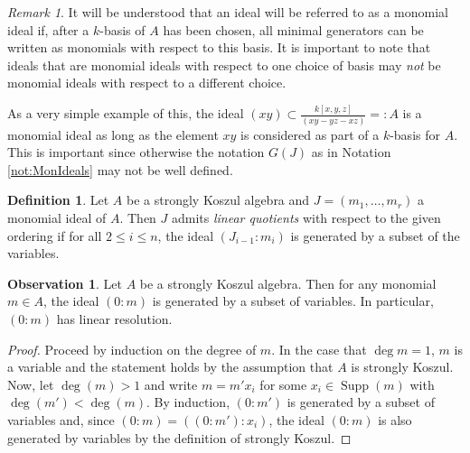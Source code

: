 \documentclass[10pt]{amsart}
\theoremstyle{definition}
\newtheorem{definition}[theorem]{Definition}
\newtheorem{obs}[theorem]{Observation}
\theoremstyle{remark}
\newtheorem{remark}[theorem]{Remark}
\newtheorem{the context}[theorem]{The Context}
\numberwithin{equation}{theorem}
\numberwithin{equation}{section}
\newcommand{\im}{\operatorname{Im}}
\newcommand{\Ker}{\operatorname{Ker}}
\newcommand{\supp}{\operatorname{Supp}}
\renewcommand{\leq}{\leqslant}
\renewcommand{\ker}{\Ker}
\def\im{\operatorname{im}}
\begin{document}
\begin{remark}\label{rk:MonIdeals}
It will be understood that an ideal will be referred to as a monomial ideal if, after a $k$-basis of $A$ has been chosen, all minimal generators can be written as monomials with respect to this basis. It is important to note that ideals that are monomial ideals with respect to one choice of basis may \emph{not} be monomial ideals with respect to a different choice.

As a very simple example of this, the ideal $(xy) \subset \frac{k[x,y,z]}{(xy-yz-xz)} =: A$ is a monomial ideal as long as the element $xy$ is considered as part of a $k$-basis for $A$. This is important since otherwise the notation $G(J)$ as in Notation \ref{not:MonIdeals} may not be well defined.
\end{remark}

\begin{definition}
Let $A$ be a strongly Koszul algebra and $J = (m_1 , \dots , m_r)$ a monomial ideal of $A$. Then $J$ admits \emph{linear quotients} with respect to the given ordering if for all $2 \leq i \leq n$, the ideal $(J_{i-1} : m_i)$ is generated by a subset of the variables.
\end{definition}

\begin{obs}\label{obs:varsColon}
Let $A$ be a strongly Koszul algebra. Then for any monomial $m \in A$, the ideal $(0: m)$ is generated by a subset of variables. In particular, $(0 : m)$ has linear resolution.
\end{obs}

\begin{proof}
Proceed by induction on the degree of $m$. In the case that $\deg m = 1$, $m$ is a variable and the statement holds by the assumption that $A$ is strongly Koszul. Now, let $\deg (m) >1$ and write $m = m' x_i$ for some $x_i \in \supp (m)$ with $\deg (m') < \deg(m)$. By induction, $(0: m')$ is generated by a subset of variables and, since $(0: m) = ((0: m') : x_i)$, the ideal $(0: m)$ is also generated by variables by the definition of strongly Koszul.


\end{proof}
\end{document}
